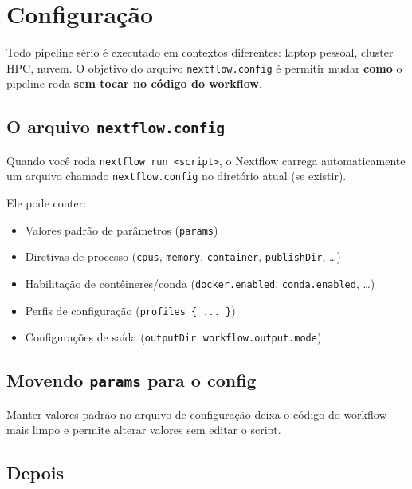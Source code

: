\documentclass[
  brazilian,
  letterpaper,
  DIV=11,
  numbers=noendperiod]{scrreprt}
\providecommand{\tightlist}{%
  \setlength{\itemsep}{0pt}\setlength{\parskip}{0pt}}
\begin{document}
\chapter{Configuração}\label{configurauxe7uxe3o}

Todo pipeline sério é executado em contextos diferentes: laptop pessoal,
cluster HPC, nuvem. O objetivo do arquivo \texttt{nextflow.config} é
permitir mudar \textbf{como} o pipeline roda \textbf{sem tocar no código
do workflow}.

\section{\texorpdfstring{O arquivo
\texttt{nextflow.config}}{O arquivo nextflow.config}}\label{o-arquivo-nextflow.config}

Quando você roda
\texttt{nextflow\ run\ \textless{}script\textgreater{}}, o Nextflow
carrega automaticamente um arquivo chamado \texttt{nextflow.config} no
diretório atual (se existir).

Ele pode conter:

\begin{itemize}
\tightlist
\item
  Valores padrão de parâmetros (\texttt{params})
\item
  Diretivas de processo (\texttt{cpus}, \texttt{memory},
  \texttt{container}, \texttt{publishDir}, \ldots)
\item
  Habilitação de contêineres/conda (\texttt{docker.enabled},
  \texttt{conda.enabled}, \ldots)
\item
  Perfis de configuração (\texttt{profiles\ \{\ ...\ \}})
\item
  Configurações de saída (\texttt{outputDir},
  \texttt{workflow.output.mode})
\end{itemize}

\section{\texorpdfstring{Movendo \texttt{params} para o
config}{Movendo params para o config}}\label{movendo-params-para-o-config}

Manter valores padrão no arquivo de configuração deixa o código do
workflow mais limpo e permite alterar valores sem editar o script.

\section{Depois}
\end{document}
